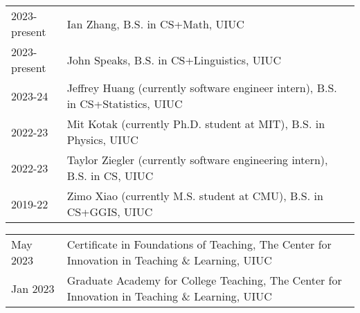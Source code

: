 \documentclass{acmcv}
\begin{document}
    \begin{longtable}{p{0.16\linewidth} p{0.84\linewidth}}
        2023-present & Ian Zhang, B.S. in CS+Math, UIUC \\
        2023-present & John Speaks, B.S. in CS+Linguistics, UIUC\\
        2023-24 & Jeffrey Huang (currently software engineer intern), B.S. in CS+Statistics, UIUC \\
        2022-23 & Mit Kotak (currently Ph.D. student at MIT), B.S. in Physics, UIUC\\
        2022-23 & Taylor Ziegler (currently software engineering intern), B.S. in CS, UIUC\\
        2019-22 & Zimo Xiao (currently M.S. student at CMU), B.S. in CS+GGIS, UIUC\\
    \end{longtable}




    \begin{longtable}{p{0.16\linewidth} p{0.84\linewidth}}
        May 2023 & Certificate in Foundations of Teaching, The Center for Innovation in Teaching \& Learning, UIUC \\

        Jan 2023 & Graduate Academy for College Teaching, The Center for Innovation in Teaching \& Learning, UIUC \\

    \end{longtable}

    


\end{document}
